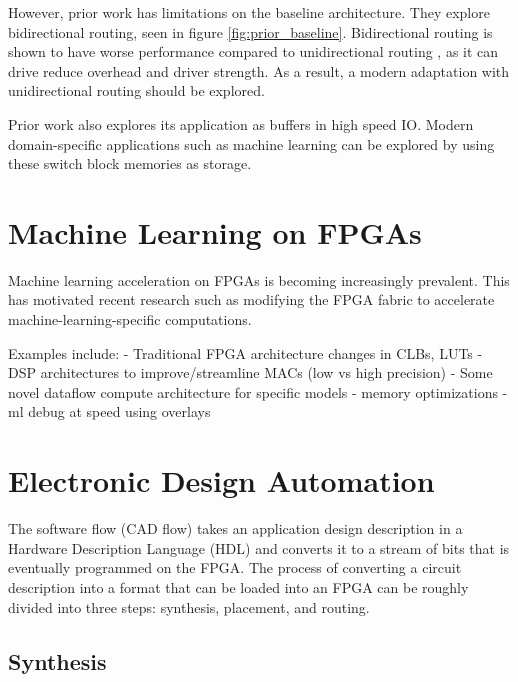 
However, prior work has limitations on the baseline architecture. They explore bidirectional routing, seen in figure \ref{fig:prior_baseline}. Bidirectional routing is shown to have worse performance compared to unidirectional routing \cite{Lemieux2004DirectionalInterconnect}, as it can drive reduce overhead and driver strength. As a result, a modern adaptation with unidirectional routing should be explored.

Prior work also explores its application as buffers in high speed IO. Modern domain-specific applications such as machine learning can be explored by using these switch block memories as storage.


\section{Machine Learning on FPGAs}
\label{bg:ml}
Machine learning acceleration on FPGAs is becoming increasingly prevalent. This has motivated recent research such as modifying the FPGA fabric to accelerate machine-learning-specific computations. 

Examples include:
- Traditional FPGA architecture changes in CLBs, LUTs
- DSP architectures to improve/streamline MACs (low vs high precision)
- Some novel dataflow compute architecture for specific models
- memory optimizations
- ml debug at speed using overlays


\section{Electronic Design Automation}
\label{bg:cad}

The software flow (CAD flow) takes an application design description in a Hardware Description Language (HDL) and converts it to a stream of bits that is eventually programmed on the FPGA. The process of converting a circuit description into a format that can be loaded into an FPGA can be roughly divided into three steps: synthesis, placement, and routing. 

\subsection{Synthesis}
\label{bg:syn}

